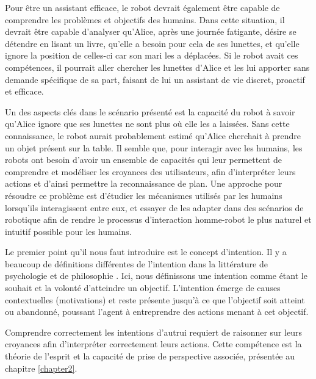 \documentclass[a4paper,11pt,twoside]{StyleThese}
\begin{document}
Pour être un assistant efficace, le robot devrait également être capable de comprendre les problèmes et objectifs des humains. Dans cette situation, il devrait être capable d'analyser qu'Alice, après une journée fatigante, désire se détendre en lisant un livre, qu'elle a besoin pour cela de ses lunettes, et qu'elle ignore la position de celles-ci car son mari les a déplacées. Si le robot avait ces compétences, il pourrait aller chercher les lunettes d'Alice et les lui apporter sans demande spécifique de sa part, faisant de lui un assistant de vie discret, proactif et efficace.

Un des aspects clés dans le scénario présenté est la capacité du robot à savoir qu'Alice ignore que ses lunettes ne sont plus où elle les a laissées. Sans cette connaissance, le robot aurait probablement estimé qu'Alice cherchait à prendre un objet présent sur la table. 
Il semble que, pour interagir avec les humains, les robots ont besoin d'avoir un ensemble de capacités qui leur permettent de comprendre et modéliser les croyances des utilisateurs, afin d'interpréter leurs actions et d'ainsi permettre la reconnaissance de plan. Une approche pour résoudre ce problème est d'étudier les mécanismes utilisés par les humains lorsqu'ils interagissent entre eux, et essayer de les adapter dans des scénarios de robotique afin de rendre le processus d'interaction homme-robot le plus naturel et intuitif possible pour les humains.

Le premier point qu'il nous faut introduire est le concept d'intention. Il y a beaucoup de définitions différentes de l'intention dans la littérature de psychologie  \cite{bruner1981} et de philosophie \cite{bratman1984}. Ici, nous définissons une intention comme étant le souhait et la volonté d'atteindre un objectif. L'intention émerge de causes contextuelles (motivations) et reste présente jusqu'à ce que l'objectif soit atteint ou abandonné, poussant l'agent à entreprendre des actions menant à cet objectif.

Comprendre correctement les intentions d'autrui requiert de raisonner sur leurs croyances afin d'interpréter correctement leurs actions. Cette compétence est la théorie de l'esprit et la capacité de prise de perspective associée, présentée au chapitre \ref{chapter2}.
\end{document}
